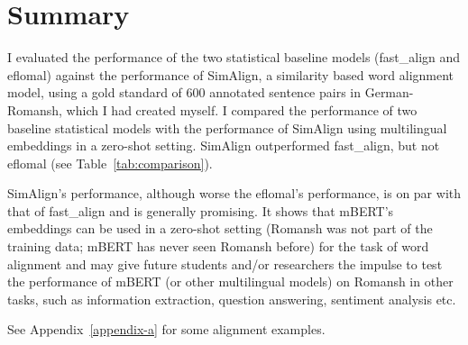 \section{Summary}
I evaluated the performance of the two statistical baseline models (fast\_align and eflomal)  against the performance of SimAlign, a similarity based word alignment model, using a gold standard of 600 annotated sentence pairs in German-Romansh, which I had created myself.
I compared the performance of two baseline statistical models with the performance of SimAlign using multilingual embeddings in a zero-shot setting. 
SimAlign outperformed fast\_align, but not eflomal (see Table~\ref{tab:comparison}). 

SimAlign's performance, although worse the eflomal's performance, is on par with that of fast\_align and is generally promising. 
It shows that mBERT's embeddings can be used in a zero-shot setting (Romansh was not part of the training data; mBERT has never seen Romansh before) for the task of word alignment and may give future students and/or researchers the impulse to test the performance of mBERT (or other multilingual models) on Romansh in other tasks, such as information extraction, question answering, sentiment analysis etc.

See Appendix~\ref{appendix-a} for some alignment examples.



